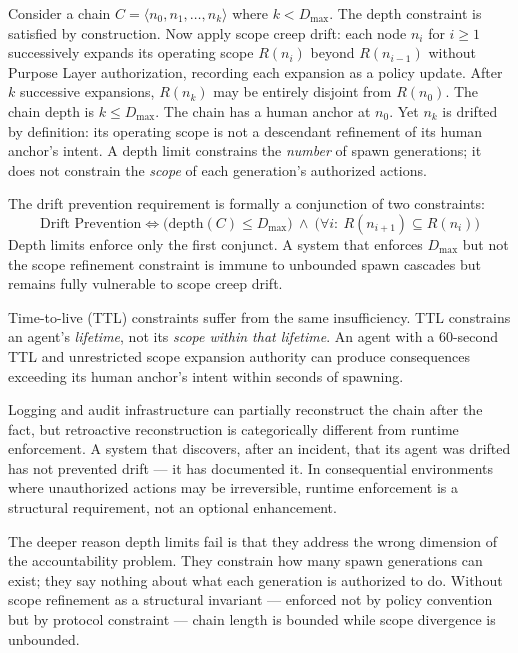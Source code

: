 Consider a chain $C = \langle n_0, n_1, \ldots, n_k \rangle$ where $k < D_{\max}$. The depth constraint is satisfied by construction. Now apply scope creep drift: each node $n_i$ for $i \geq 1$ successively expands its operating scope $R(n_i)$ beyond $R(n_{i-1})$ without Purpose Layer authorization, recording each expansion as a policy update. After $k$ successive expansions, $R(n_k)$ may be entirely disjoint from $R(n_0)$. The chain depth is $k \leq D_{\max}$. The chain has a human anchor at $n_0$. Yet $n_k$ is drifted by definition: its operating scope is not a descendant refinement of its human anchor's intent. A depth limit constrains the \emph{number} of spawn generations; it does not constrain the \emph{scope} of each generation's authorized actions.

The drift prevention requirement is formally a conjunction of two constraints:
\begin{equation}
\text{Drift Prevention} \iff \bigl(\text{depth}(C) \leq D_{\max}\bigr)\ \land\ \bigl(\forall i:\ R(n_{i+1}) \subseteq R(n_i)\bigr)
\label{eq:intro-drift-prevention}
\end{equation}
Depth limits enforce only the first conjunct. A system that enforces $D_{\max}$ but not the scope refinement constraint is immune to unbounded spawn cascades but remains fully vulnerable to scope creep drift.

Time-to-live (TTL) constraints suffer from the same insufficiency. TTL constrains an agent's \emph{lifetime}, not its \emph{scope within that lifetime}. An agent with a 60-second TTL and unrestricted scope expansion authority can produce consequences exceeding its human anchor's intent within seconds of spawning.

Logging and audit infrastructure can partially reconstruct the chain after the fact, but retroactive reconstruction is categorically different from runtime enforcement. A system that discovers, after an incident, that its agent was drifted has not prevented drift — it has documented it. In consequential environments where unauthorized actions may be irreversible, runtime enforcement is a structural requirement, not an optional enhancement.

The deeper reason depth limits fail is that they address the wrong dimension of the accountability problem. They constrain how many spawn generations can exist; they say nothing about what each generation is authorized to do. Without scope refinement as a structural invariant — enforced not by policy convention but by protocol constraint — chain length is bounded while scope divergence is unbounded.

